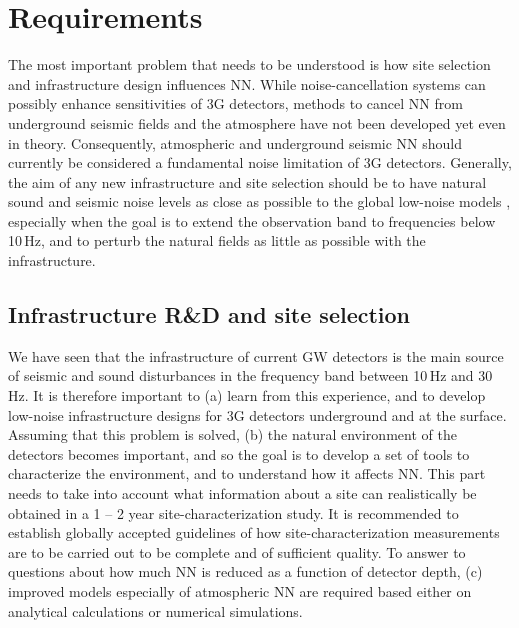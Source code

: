 \section{Requirements}
The most important problem that needs to be understood is how site selection and infrastructure design influences NN. While noise-cancellation systems can possibly enhance sensitivities of 3G detectors, methods to cancel NN from underground seismic fields and the atmosphere have not been developed yet even in theory. Consequently, atmospheric and underground seismic NN should currently be considered a fundamental noise limitation of 3G detectors. Generally, the aim of any new infrastructure and site selection should be to have natural sound and seismic noise levels as close as possible to the global low-noise models \cite{Pet1993}, especially when the goal is to extend the observation band to frequencies below 10\,Hz, and to perturb the natural fields as little as possible with the infrastructure. 

\subsection{Infrastructure R\&D and site selection}
We have seen that the infrastructure of current GW detectors is the main source of seismic and sound disturbances in the frequency band between 10\,Hz and 30\,Hz. It is therefore important to (a) learn from this experience, and to develop low-noise infrastructure designs for 3G detectors underground and at the surface. Assuming that this problem is solved, (b) the natural environment of the detectors becomes important, and so the goal is to develop a set of tools to characterize the environment, and to understand how it affects NN. This part needs to take into account what information about a site can realistically be obtained in a 1 -- 2 year site-characterization study. It is recommended to establish globally accepted guidelines of how site-characterization measurements are to be carried out to be complete and of sufficient quality. To answer to questions about how much NN is reduced as a function of detector depth, (c) improved models especially of atmospheric NN are required based either on analytical calculations or numerical simulations.

